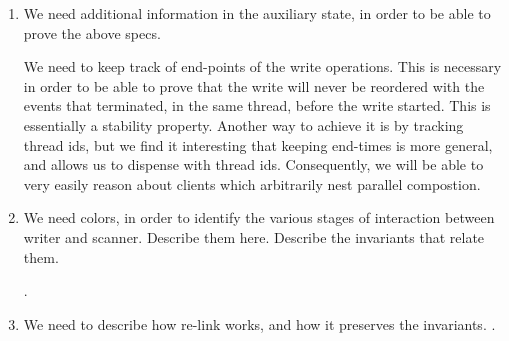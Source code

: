 \begin{enumerate}
\item We need additional information in the auxiliary state, in order
  to be able to prove the above specs.

  We need to keep track of end-points of the write operations. This is
  necessary in order to be able to prove that the write will never be
  reordered with the events that terminated, in the same thread,
  before the write started. This is essentially a stability
  property. Another way to achieve it is by tracking thread ids, but
  we find it interesting that keeping end-times is more general, and
  allows us to dispense with thread ids. Consequently, we will be able
  to very easily reason about clients which arbitrarily nest parallel
  compostion.  

\item We need colors, in order to identify the various stages of
  interaction between writer and scanner. Describe them here. Describe
  the invariants that relate them. 

  .
  
\item We need to describe how re-link works, and how it preserves the
  invariants.  . 
  



\end{enumerate}

